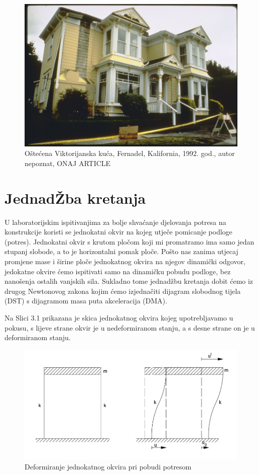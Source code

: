 \documentclass[12pt]{book}
\begin{document}
\begin{figure}[h]
	\centering
	\includegraphics[width=1\linewidth]{Slike/cape_mandecino}
	\caption{Oštećena Viktorijanska kuća, Fernadel, Kalifornia, 1992. god., autor nepoznat, ONAJ ARTICLE }
	\label{fig:capemandecino}
\end{figure}


\chapter{JednadŽba kretanja}
U laboratorijskim ispitivanjima za bolje shvaćanje djelovanja potresa na konstrukcije koristi se jednokatni okvir na kojeg utječe pomicanje podloge (potres). Jednokatni okvir s krutom pločom koji mi promatramo ima samo jedan stupanj slobode, a to je horizontalni pomak ploče. Pošto nas zanima utjecaj promjene mase i širine ploče jednokatnog okvira na njegov dinamički odgovor, jedokatne okvire ćemo ispitivati samo na dinamičku pobudu podloge, bez nanošenja ostalih vanjskih sila. Sukladno tome jednadžbu kretanja dobit ćemo iz drugog Newtonovog zakona kojim ćemo izjednačiti dijagram slobodnog tijela (DST) s dijagramom masa puta akceleracija (DMA).


Na Slici 3.1 prikazana je skica jednokatnog okvira kojeg upotrebljavamo u pokusu, s lijeve strane okvir je u nedeformiranom stanju, a s desne strane on je u deformiranom stanju.

\begin{figure}[h]
	\centering
	\includegraphics[width=1\linewidth]{Slike/screenshot003}
	\caption{Deformiranje jednokatnog okvira pri pobudi potresom}
	\label{fig:screenshot004}
\end{figure}
\end{document}
